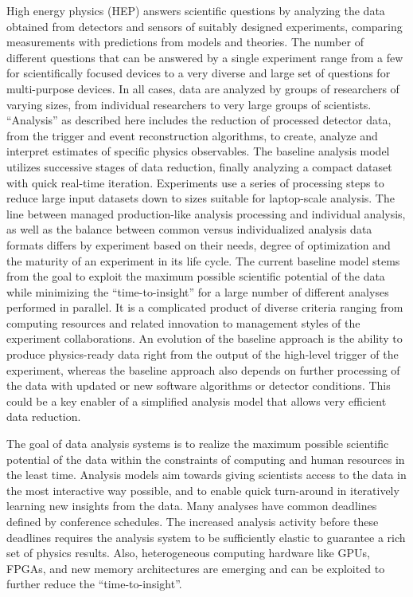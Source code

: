\documentclass[12pt,a4paper]{article}
\begin{document}
High energy physics (HEP) answers scientific questions by analyzing the data obtained from detectors and sensors of suitably designed experiments, comparing measurements with predictions from models and theories. The number of different questions that can be answered by a single experiment range from a few for scientifically focused devices to a very diverse and large set of questions for multi-purpose devices. In all cases, data are analyzed by groups of researchers of varying sizes, from individual researchers to very large groups of scientists. ``Analysis'' as described here includes the reduction of processed detector data, from the trigger and event reconstruction algorithms, to create, analyze and interpret estimates of specific physics observables. The baseline analysis model utilizes successive stages of data reduction, finally analyzing a compact dataset with quick real-time iteration. Experiments use a series of processing steps to reduce large input datasets down to sizes suitable for laptop-scale analysis. The line between managed production-like analysis processing and individual analysis, as well as the balance between common versus individualized analysis data formats differs by experiment based on their needs, degree of optimization and the maturity of an experiment in its life cycle. The current baseline model stems from the goal to exploit the maximum possible scientific potential of the data while minimizing the ``time-to-insight'' for a large number of different analyses performed in parallel. It is a complicated product of diverse criteria ranging from computing resources and related innovation to management styles of the experiment collaborations. An evolution of the baseline approach is the ability to produce physics-ready data right from the output of the high-level trigger of the experiment, whereas the baseline approach also depends on further processing of the data with updated or new software algorithms or detector conditions. This could be a key enabler of a simplified analysis model that allows very efficient data reduction.

The goal of data analysis systems is to realize the maximum possible scientific potential of the data within the constraints of computing and human resources in the least time.
Analysis models aim towards giving scientists access to the data in the most interactive way possible, and to enable quick turn-around in iteratively learning new insights from the data. Many analyses have common deadlines defined by conference schedules. The increased analysis activity before these deadlines requires the analysis system to be sufficiently elastic to guarantee a rich set of physics results. Also, heterogeneous computing hardware like GPUs, FPGAs, and new memory architectures are emerging and can be exploited to further reduce the ``time-to-insight''.
\end{document}
